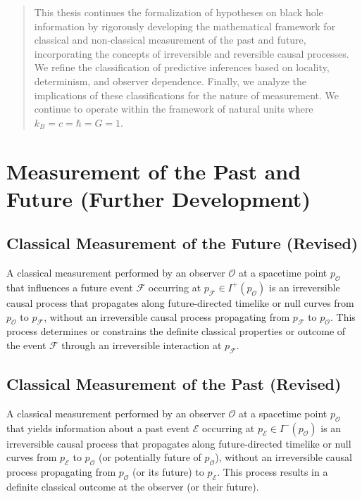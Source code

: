 	
	
	\begin{abstract}
		This thesis continues the formalization of hypotheses on black hole information by rigorously developing the mathematical framework for classical and non-classical measurement of the past and future, incorporating the concepts of irreversible and reversible causal processes. We refine the classification of predictive inferences based on locality, determinism, and observer dependence. Finally, we analyze the implications of these classifications for the nature of measurement. We continue to operate within the framework of natural units where $k_B = c = \hbar = G = 1$.
	\end{abstract}
	
	\section{Measurement of the Past and Future (Further Development)}
	
	\subsection{Classical Measurement of the Future (Revised)}
	
	\begin{definition}
		A classical measurement performed by an observer $\mathcal{O}$ at a spacetime point $p_{\mathcal{O}}$ that influences a future event $\mathcal{F}$ occurring at $p_{\mathcal{F}} \in I^+(p_{\mathcal{O}})$ is an irreversible causal process that propagates along future-directed timelike or null curves from $p_{\mathcal{O}}$ to $p_{\mathcal{F}}$, without an irreversible causal process propagating from $p_{\mathcal{F}}$ to $p_{\mathcal{O}}$. This process determines or constrains the definite classical properties or outcome of the event $\mathcal{F}$ through an irreversible interaction at $p_{\mathcal{F}}$.
	\end{definition}
	
	\subsection{Classical Measurement of the Past (Revised)}
	
	\begin{definition}
		A classical measurement performed by an observer $\mathcal{O}$ at a spacetime point $p_{\mathcal{O}}$ that yields information about a past event $\mathcal{E}$ occurring at $p_{\mathcal{E}} \in I^-(p_{\mathcal{O}})$ is an irreversible causal process that propagates along future-directed timelike or null curves from $p_{\mathcal{E}}$ to $p_{\mathcal{O}}$ (or potentially future of $p_{\mathcal{O}}$), without an irreversible causal process propagating from $p_{\mathcal{O}}$ (or its future) to $p_{\mathcal{E}}$. This process results in a definite classical outcome at the observer (or their future).
	\end{definition}
	
